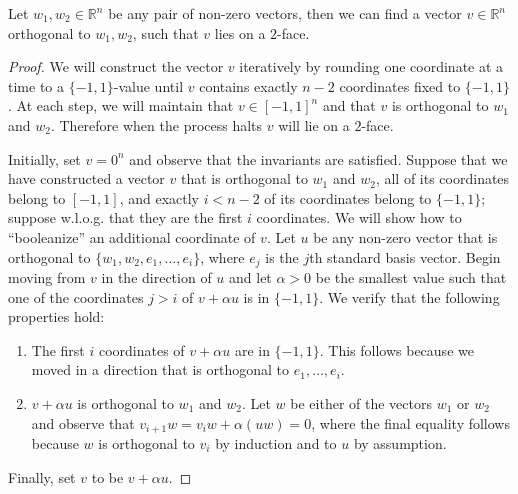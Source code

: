 \documentclass{toc}
\begin{document}
\begin{lemma} \label{lem:orthogonal_vector}
Let $w_1, w_2 \in \mathbb{R}^n$ be any pair of non-zero vectors, then we can find a vector $v \in \mathbb{R}^n$ orthogonal to $w_1, w_2$, such that $v$ lies on a $2$-face.
\end{lemma}
\begin{proof}
	We will construct the vector $v$ iteratively by rounding one coordinate at a time to a $\{-1,1\}$-value until $v$ contains exactly $n-2$ coordinates fixed to $\{-1,1\}$. At each step, we will maintain that $v \in [-1,1]^n$ and that $v$ is orthogonal to $w_1$ and $w_2$. Therefore when the process halts $v$ will lie on a $2$-face.
	
	Initially, set $v = 0^n$ and observe that the invariants are satisfied. Suppose that we have constructed a vector $v$ that is orthogonal to $w_1$ and $w_2$, all of its coordinates belong to $[-1,1]$, and exactly $i < n-2$ of its coordinates belong to $\{-1,1\}$; suppose w.l.o.g. that they are the first $i$ coordinates. We will show how to ``booleanize'' an additional coordinate of $v$. Let $u$ be any non-zero vector that is orthogonal to $\{w_1, w_2, e_1, \ldots, e_i\}$, where $e_j$ is the $j$th standard basis vector. Begin moving from $v$ in the direction of $u$ and let $\alpha > 0$ be the smallest value such that one of the coordinates $j > i$ of $v + \alpha u$ is in $\{-1, 1\}$. %
	We verify that the following properties hold:
	\begin{enumerate}
		\item The first $i$ coordinates of $v + \alpha u$ are in $\{ -1, 1\}$. This follows because we moved in a direction that is orthogonal to $e_1, \ldots, e_i$. %
		\item $v + \alpha u$ is orthogonal to $w_1$ and $w_2$. Let $w$ be either of the vectors $w_1$ or $w_2$ and observe that  $v_{i+1}w = v_iw + \alpha (uw) = 0$,
		where the final equality follows because $w$ is orthogonal to $v_i$ by induction and to $u$ by assumption. 
	\end{enumerate}
	Finally, set $v$ to be  $v + \alpha u$. 
\end{proof}
\end{document}
